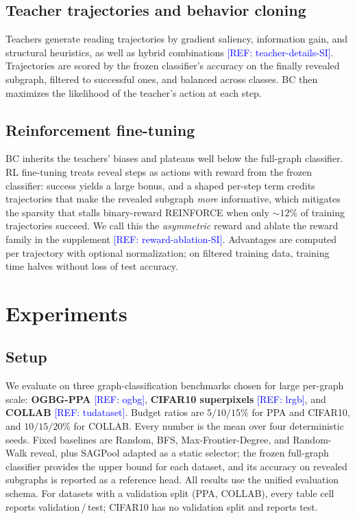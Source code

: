 \documentclass{article}
\newcommand{\refadd}[1]{\textcolor{blue}{[REF: #1]}}
\begin{document}
\subsection{Teacher trajectories and behavior cloning}
Teachers generate reading trajectories by gradient saliency, information gain, and structural heuristics, as well as hybrid combinations \refadd{teacher-details-SI}. Trajectories are scored by the frozen classifier's accuracy on the finally revealed subgraph, filtered to successful ones, and balanced across classes. BC then maximizes the likelihood of the teacher's action at each step.

\subsection{Reinforcement fine-tuning}
BC inherits the teachers' biases and plateaus well below the full-graph classifier. RL fine-tuning treats reveal steps as actions with reward from the frozen classifier: success yields a large bonus, and a shaped per-step term credits trajectories that make the revealed subgraph \emph{more} informative, which mitigates the sparsity that stalls binary-reward REINFORCE when only $\sim$$12\%$ of training trajectories succeed. We call this the \emph{asymmetric} reward and ablate the reward family in the supplement \refadd{reward-ablation-SI}. Advantages are computed per trajectory with optional normalization; on filtered training data, training time halves without loss of test accuracy.

\section{Experiments}
\label{sec:results}

\subsection{Setup}
\label{sec:setup-exp}
We evaluate on three graph-classification benchmarks chosen for large per-graph scale: \textbf{OGBG-PPA} \refadd{ogbg}, \textbf{CIFAR10 superpixels} \refadd{lrgb}, and \textbf{COLLAB} \refadd{tudataset}. Budget ratios are $5/10/15\%$ for PPA and CIFAR10, and $10/15/20\%$ for COLLAB. Every number is the mean over four deterministic seeds. Fixed baselines are Random, BFS, Max-Frontier-Degree, and Random-Walk reveal, plus SAGPool adapted as a static selector; the frozen full-graph classifier provides the upper bound for each dataset, and its accuracy on revealed subgraphs is reported as a reference head. All results use the unified evaluation schema. For datasets with a validation split (PPA, COLLAB), every table cell reports validation\,/\,test; CIFAR10 has no validation split and reports test.
\end{document}
